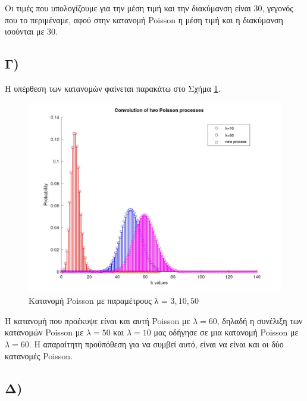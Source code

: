 \documentclass{article}
\newcommand{\english}[1]{\foreignlanguage{english}{{#1}}}
\begin{document}
Οι τιμές που υπολογίζουμε για την μέση τιμή και την διακύμανση είναι $30$, γεγονός που το περιμέναμε, αφού στην κατανομή Poisson η μέση τιμή και η διακύμανση ισούνται με $30$.

\subsection*{Γ)}

Η υπέρθεση των κατανομών φαίνεται παρακάτω στο Σχήμα \ref{fig:poisson_conv}.

\begin{figure}
    \centering
    \includegraphics[width=\textwidth]{poisson_conv.jpg}
    \caption{Κατανομή \english{Poisson} με παραμέτρους λ = ${3, 10, 50}$}
    \label{fig:poisson_conv}
\end{figure}


Η κατανομή που προέκυψε είναι και αυτή \english{Poisson} με $λ = 60$, δηλαδή η συνέλιξη των κατανομών \english{Poisson} με $λ = 50$ και $λ = 10$ μας οδήγησε σε μια κατανομή \english{Poisson} με $λ = 60$. H απαραίτητη προϋπόθεση για να συμβεί αυτό, είναι να είναι και οι δύο κατανομές \english{Poisson}.

\subsection*{Δ)}
\end{document}
